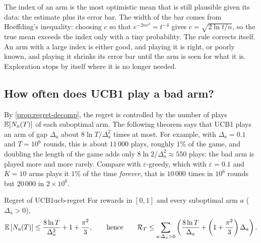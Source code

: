 \begin{intuition}
  The index of an arm is the most optimistic mean that is still plausible
  given its data: the estimate plus its error bar. The width of the bar
  comes from Hoeffding's inequality: choosing $c$ so that $e^{-2 n c^2} =
  t^{-4}$ gives $c = \sqrt{2 \ln t / n}$, so the true mean exceeds the
  index only with a tiny probability. The rule corrects itself. An arm with
  a large index is either good, and playing it is right, or poorly known,
  and playing it shrinks its error bar until the arm is seen for what it
  is. Exploration stops by itself where it is no longer needed.
\end{intuition}

\subsection{How often does UCB1 play a bad arm?}

By \cref{prop:regret-decomp}, the regret is controlled by the number of
plays $\mathbb{E}[N_a(T)]$ of each suboptimal arm. The following theorem says that
UCB1 plays an arm of gap $\Delta_a$ about $8 \ln T / \Delta_a^2$ times at
most. For example, with $\Delta_a = 0.1$ and $T = 10^6$ rounds, this is
about $11\,000$ plays, roughly $1\%$ of the game, and doubling the length
of the game adds only $8 \ln 2 / \Delta_a^2 \approx 550$ plays: the bad arm
is played more and more rarely. Compare with $\varepsilon$-greedy, which
with $\varepsilon = 0.1$ and $K = 10$ arms plays it $1\%$ of the time
\emph{forever}, that is $10\,000$ times in $10^6$ rounds but $20\,000$ in
$2 \times 10^6$.

\begin{theorem}{Regret of UCB1}{ucb-regret}
  For rewards in $[0, 1]$ and every suboptimal arm $a$ ($\Delta_a > 0$),
  \begin{equation}
    \mathbb{E}\left[N_a(T)\right] \leq \frac{8 \ln T}{\Delta_a^2} + 1 +
    \frac{\pi^2}{3},
    \qquad \text{hence} \qquad
    \mathcal{R}_T \leq \sum_{a : \Delta_a > 0} \left( \frac{8 \ln
    T}{\Delta_a} + \left(1 + \frac{\pi^2}{3}\right) \Delta_a \right).
  \end{equation}
\end{theorem}

